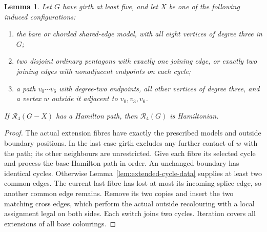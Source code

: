 \documentclass[11pt]{article}
\newtheorem{lemma}[theorem]{Lemma}
\theoremstyle{remark}
\newcommand{\R}{\mathcal R}
\numberwithin{equation}{section}
\numberwithin{table}{section}
\begin{document}
\begin{lemma}\label{lem:extended-cycle-restoration}
Let $G$ have girth at least five, and let $X$ be one of the following
induced configurations:
\begin{enumerate}
\item the bare or chorded shared-edge model, with all eight vertices
of degree three in $G$;
\item two disjoint ordinary pentagons with exactly one joining edge,
or exactly two joining edges with nonadjacent endpoints on each cycle;
\item a path $v_0\cdots v_6$ with degree-two endpoints, all other
vertices of degree three, and a vertex $w$ outside it adjacent to
$v_0,v_3,v_6$.
\end{enumerate}
If $\R_4(G-X)$ has a Hamilton path, then $\R_4(G)$ is Hamiltonian.
\end{lemma}
\begin{proof}
The actual extension fibres have exactly the prescribed models and
outside boundary positions. In the last case girth excludes any further contact
of $w$ with the path; its other neighbours are unrestricted.
Give each fibre its selected cycle and process the base Hamilton
path in order. An unchanged boundary has identical cycles. Otherwise
Lemma~\ref{lem:extended-cycle-data} supplies at least two common edges.
The current last fibre has lost at most its incoming splice edge, so
another common edge remains. Remove its two copies and insert the two
matching cross edges, which perform the actual outside recolouring
with a local assignment legal on both sides. Each switch joins two
cycles. Iteration covers all extensions of all base colourings.
\end{proof}
\end{document}
